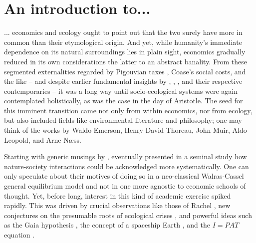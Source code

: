 \documentclass{article}
\begin{document}
\begin{refsection}

\label{intro}
\section{An introduction to...}

... economics and ecology ought to point out that the two surely have more in common than their etymological origin. And yet, while humanity's immediate dependence on its natural surroundings lies in plain sight, economics gradually reduced in its own considerations the latter to an abstract banality. From these segmented externalities regarded by Pigouvian taxes \parencites{pigou_2017}[see also][]{baumol_1972}, Coase's \parencite*{coase_1960} social costs, and the like -- and despite earlier fundamental insights by \textcite{carlowitz_1713}, \textcite{jevons_1865}, \textcite{arrhenius_1896}, and their respective contemporaries -- it was a long way until socio-ecological systems were again contemplated holistically, as was the case in the day of Aristotle. The seed for this imminent transition came not only from within economics, nor from ecology, but also included fields like environmental literature and philosophy; one may think of the works by Waldo Emerson, Henry David Thoreau, John Muir, Aldo Leopold, and Arne Næss.

Starting with generic musings by \textcite{daly_1968,isard_1968,cumberland_1966}, \textcite{ayres_kneese_1969} eventually presented in a seminal study how nature-society interactions could be acknowledged more systematically. One can only speculate about their motives of doing so in a neo-classical Walras-Cassel general equilibrium model and not in one more agnostic to economic schools of thought. Yet, before long, interest in this kind of academic exercise spiked rapidly. This was driven by crucial observations like those of Rachel \textcite{carson_1962}, new conjectures on the presumable roots of ecological crises \parencite{white_1967}, and powerful ideas such as the Gaia hypothesis \parencite{lovelock_1972,lovelock_1974}, the concept of a spaceship Earth \parencite{boulding_1966}, and the $I=PAT$ equation \parencite{ehrlich_1972,commoner_1972,chertow_2001}.


\end{refsection}
\end{document}
